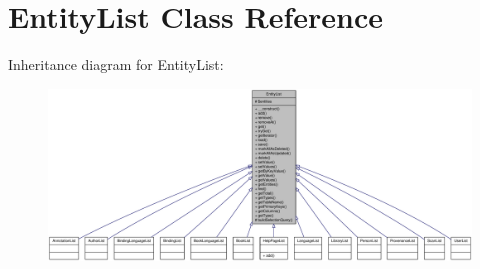 \hypertarget{classEntityList}{
\section{EntityList Class Reference}
\label{classEntityList}
}


Inheritance diagram for EntityList:\nopagebreak
\begin{figure}[H]
\begin{center}
\leavevmode
\includegraphics[width=400pt]{classEntityList__inherit__graph}
\end{center}
\end{figure}
